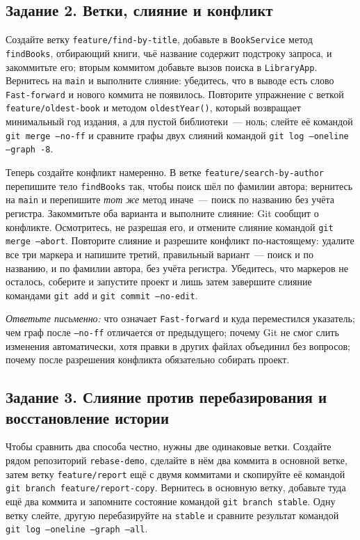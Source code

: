 \subsection*{Задание 2. Ветки, слияние и конфликт}

Создайте ветку \texttt{feature/find-by-title}, добавьте в \texttt{BookService} метод \texttt{findBooks}, отбирающий книги, чьё название содержит подстроку запроса, и закоммитьте его; вторым коммитом добавьте вызов поиска в \texttt{LibraryApp}. Вернитесь на \texttt{main} и выполните слияние: убедитесь, что в выводе есть слово \texttt{Fast-forward} и нового коммита не появилось. Повторите упражнение с веткой \texttt{feature/oldest-book} и методом \texttt{oldestYear()}, который возвращает минимальный год издания, а для пустой библиотеки~--- ноль; слейте её командой \texttt{git merge --no-ff} и сравните графы двух слияний командой \texttt{git log --oneline --graph -8}.

\begin{sloppypar}
Теперь создайте конфликт намеренно. В ветке \texttt{feature/search-by-author} перепишите тело \texttt{findBooks} так, чтобы поиск шёл по фамилии автора; вернитесь на \texttt{main} и перепишите \emph{тот же} метод иначе~--- поиск по названию без учёта регистра. Закоммитьте оба варианта и выполните слияние: Git сообщит о конфликте. Осмотритесь, не разрешая его, и отмените слияние командой \texttt{git merge --abort}. Повторите слияние и разрешите конфликт по-настоящему: удалите все три маркера и напишите третий, правильный вариант~--- поиск и по названию, и по фамилии автора, без учёта регистра. Убедитесь, что маркеров не осталось, соберите и запустите проект и лишь затем завершите слияние командами \texttt{git add} и \texttt{git commit --no-edit}.
\end{sloppypar}

\emph{Ответьте письменно:} что означает \texttt{Fast-forward} и куда переместился указатель; чем граф после \texttt{--no-ff} отличается от предыдущего; почему Git не смог слить изменения автоматически, хотя правки в других файлах объединил без вопросов; почему после разрешения конфликта обязательно собирать проект.

\subsection*{Задание 3. Слияние против перебазирования и восстановление истории}

Чтобы сравнить два способа честно, нужны две одинаковые ветки. Создайте рядом репозиторий \texttt{rebase-demo}, сделайте в нём два коммита в основной ветке, затем ветку \texttt{feature/report} ещё с двумя коммитами и скопируйте её командой \texttt{git branch feature/report-copy}. Вернитесь в основную ветку, добавьте туда ещё два коммита и запомните состояние командой \texttt{git branch stable}. Одну ветку слейте, другую перебазируйте на \texttt{stable} и сравните результат командой \texttt{git log --oneline --graph --all}.

